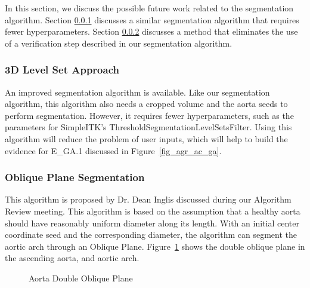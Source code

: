 In this section, we discuss the possible future work related to the segmentation algorithm. Section \ref{new_seg} discusses a similar segmentation algorithm that requires fewer hyperparameters. Section \ref{inglis_seg} discusses a method that eliminates the use of a verification step described in our segmentation algorithm.

\subsubsection{3D Level Set Approach}\label{new_seg}
An improved segmentation algorithm \cite{6346433} is available. Like our segmentation algorithm, this algorithm also needs a cropped volume and the aorta seeds to perform segmentation. However, it requires fewer hyperparameters, such as the parameters for SimpleITK's ThresholdSegmentationLevelSetsFilter. Using this algorithm will reduce the problem of user inputs, which will help to build the evidence for E\_GA.1 discussed in Figure~\ref{fig_agr_ac_ga}.

\subsubsection{Oblique Plane Segmentation}\label{inglis_seg}
This algorithm is proposed by Dr. Dean Inglis discussed during our Algorithm Review meeting. This algorithm is based on the assumption that a healthy aorta should have reasonably uniform diameter along its length. With an initial center coordinate seed and the corresponding diameter, the algorithm can segment the aortic arch through an Oblique Plane. Figure~\ref{fig_oblique} shows the double oblique plane in the ascending aorta, and aortic arch.

\begin{figure}[H]
    \centering
    \caption[Aorta Double Oblique Plane]{Aorta Double Oblique Plane}
    \label{fig_oblique}
\end{figure}

